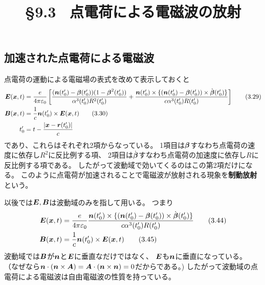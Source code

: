 \documentclass[a4paper, 10pt]{jsarticle}
\title{\S 9.3 \ 点電荷による電磁波の放射}
\author{}
\theoremstyle{definition}
\def\vec#1{\mbox{\boldmath $#1$}}
\begin{document}
\maketitle

\setcounter{subsection}{1}
\subsection{加速された点電荷による電磁波}

点電荷の運動による電磁場の表式を改めて表示しておくと
\begin{align}
	\vec{E}(\vec{x}, t) &= \frac{e}{4\pi\varepsilon_0} \left[
		\frac{(\vec{n}(t'_0) - \vec{\beta}(t'_0))(1 - \vec{\beta}^2(t'_0))}
		{\alpha^3(t'_0)R^2(t'_0)}
		+ \frac{\vec{n}(t'_0) \times
		\{ (\vec{n}(t'_0) - \vec{\beta}(t'_0)) \times \dot{\vec{\beta}}(t'_0) \}}
		{c\alpha^3(t'_0) R(t'_0)}
	\right]
	\tag{3.29} \label{3.29} \\
	\vec{B}(\vec{x}, t)
	&= \frac{1}{c} \vec{n}(t'_0) \times \vec{E}(\vec{x}, t)
	\tag{3.30} \label{3.30} \\
	t'_0 &= t - \frac{|\vec{x} - \vec{r}(t'_0)|}{c}
\end{align}
であり、これらはそれぞれ2項からなっている。
1項目は$\vec{\beta}$すなわち点電荷の速度に依存し$R^2$に反比例する項、
2項目は$\dot{\vec{\beta}}$すなわち点電荷の加速度に依存し$R$に反比例する項である。
したがって波動域で効いてくるのはこの第2項だけになる。
このように点電荷が加速されることで電磁波が放射される現象を\textbf{制動放射}という。

以後では$\vec{E}, \vec{B}$は波動域のみを指して用いる。
つまり
\begin{align}
	\vec{E}(\vec{x}, t) &= \frac{e}{4\pi\varepsilon_0}
	\frac{\vec{n}(t'_0) \times
	\{ (\vec{n}(t'_0) - \vec{\beta}(t'_0)) \times \dot{\vec{\beta}}(t'_0) \}}
	{c\alpha^3(t'_0) R(t'_0)}
	\tag{3.44} \label{3.44} \\
	\vec{B}(\vec{x}, t)
	&= \frac{1}{c} \vec{n}(t'_0) \times \vec{E}(\vec{x}, t)
	\label{3.45} \tag{3.45}
\end{align}
波動域では$\vec{B}$が$\vec{n}$と$\vec{E}$に垂直なだけではなく、
$\vec{E}$も$\vec{n}$に垂直になっている。
（なぜなら$\vec{n} \cdot (\vec{n} \times \vec{A})
= \vec{A} \cdot (\vec{n} \times \vec{n}) = 0$だからである。)
したがって波動域の点電荷による電磁波は自由電磁波の性質を持っている。
\end{document}
